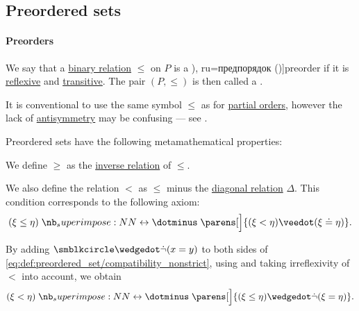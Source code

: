 \subsection{Preordered sets}\label{subsec:preordered_sets}

\paragraph{Preorders}

\begin{definition}\label{def:preordered_set}
  We say that a \hyperref[def:binary_relation]{binary relation} \( \leq \) on \( P \) is a \term[bg=преднаредба (\cite[9]{Проданов1982ФункАнализТом1}), ru=предпорядок (\cite[def 3.1]{Гуров2013Решётки})]{preorder} if it is \hyperref[def:binary_relation/reflexive]{reflexive} and \hyperref[def:binary_relation/transitive]{transitive}. The pair \( (P, \leq) \) is then called a .

  It is conventional to use the same symbol \( \leq \) as for \hyperref[def:partially_ordered_set]{partial orders}, however the lack of \hyperref[def:binary_relation/antisymmetric]{antisymmetry} may be confusing --- see .

  Preordered sets have the following metamathematical properties:
  \begin{thmenum}[series=def:preordered_set]
     We define \( \geq \) as the \hyperref[def:binary_relation/inverse]{inverse relation} of \( \leq \).

     We also define the relation \( < \) as \( \leq \) minus the \hyperref[def:binary_relation/diagonal]{diagonal relation} \( \Delta \). This condition corresponds to the following axiom:
    \begin{equation}\label{eq:def:preordered_set/compatibility_nonstrict}
      (\xi \leq \eta) \syniff \parens[\Big]{(\xi < \eta) \synvee (\xi \syneq \eta)}.
    \end{equation}

    By adding \( \anon \synwedge \synneg (x = y) \) to both sides of \eqref{eq:def:preordered_set/compatibility_nonstrict}, using  and taking irreflexivity of \( < \) into account, we obtain
    \begin{equation}\label{eq:def:preordered_set/compatibility_strict}
      (\xi < \eta) \syniff \parens[\Big]{(\xi \leq \eta) \synwedge \synneg (\xi = \eta)}.
    \end{equation}


\end{thmenum}
\end{definition}
